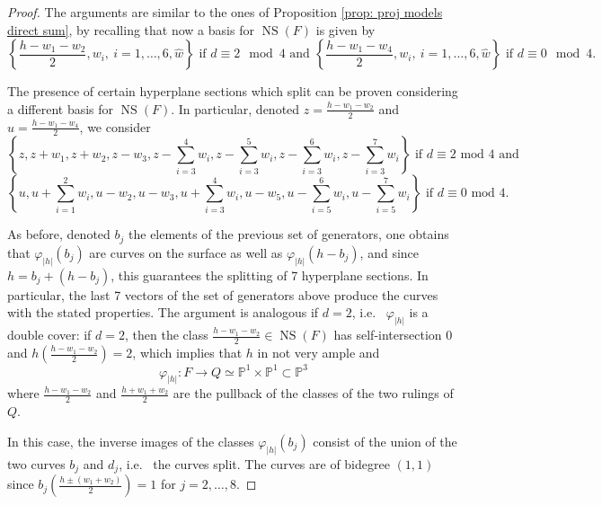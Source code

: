 \documentclass{amsart}
\theoremstyle{definition}
\numberwithin{equation}{section}
\numberwithin{equation}{section} \theoremstyle{definition}
\DeclareMathOperator{\NS}{NS}
\newcommand{\ra}{\rightarrow}
\begin{document}
\begin{proof}
The arguments are similar to the ones of Proposition \ref{prop: proj models direct sum}, by recalling that now a basis for $\NS(F)$ is given by $$\left\{\frac{h-w_1-w_2}{2}, w_i,\ i=1,\ldots, 6, \hat{w}\right\}\mbox{ if }d\equiv 2\mod 4\mbox{ and }\left\{\frac{h-w_1-w_4}{2}, w_i,\ i=1,\ldots, 6, \hat{w}\right\}\mbox{ if }d\equiv 0\mod 4.$$


The presence of certain hyperplane sections which split can be proven considering a different basis for $\NS(F)$. In particular, denoted $z=\frac{h-w_1-w_2}{2}$ and $u=\frac{h-w_1-w_4}{2}$, we consider $$\left\{z, z+w_1,z+w_2, z-w_3, z-\sum_{i=3}^4w_i, z-\sum_{i=3}^5w_i,  z-\sum_{i=3}^6w_i, z-\sum_{i=3}^7w_i\right\}\mbox { 
if }d\equiv 2\mbox{ mod }4\mbox{  and }$$
$$\left\{u, u+\sum_{i=1}^2w_i,u-w_2,u-w_3,u+\sum_{i=3}^4w_i,u-w_5,u-\sum_{i=5}^6w_i,u-\sum_{i=5}^7w_i\right\}\mbox{ 
if }d\equiv 0\mbox{ mod }4.$$

As before, denoted $b_j$ the elements of the previous set of generators, one obtains that $\varphi_{|h|}(b_j)$ are curves on the surface as well as $\varphi_{|h|}(h-b_j)$, and since $h=b_j+(h-b_j)$, this guarantees the splitting of 7 hyperplane sections. In particular, the last 7 vectors of the set of generators above produce the curves with the stated properties. The argument is analogous if $d=2$, i.e.~ $\varphi_{|h|}$ is a double cover: if $d=2$, then the class $\frac{h-w_1-w_2}{2}\in \NS(F)$ has self-intersection 0 and $h(\frac{h-w_1-w_2}{2})=2$, which implies that $h$ in not very ample and $$\varphi_{|h|}:F\ra Q\simeq\mathbb{P}^1\times \mathbb{P}^1\subset\mathbb{P}^3$$ where $\frac{h-w_1-w_2}{2}$ and $\frac{h+w_1+w_2}{2}$ are the pullback of the classes of the two rulings of $Q$.

In this case, the inverse images of the classes $\varphi_{|h|}(b_j)$ consist of the union of the two curves $b_j$ and $d_j$, i.e.~ the curves split. The curves are of bidegree $(1,1)$ since $b_j(\frac{h\pm(w_1+w_2)}{2})=1$ for $j=2,\ldots,8$.
\end{proof}
\end{document}

